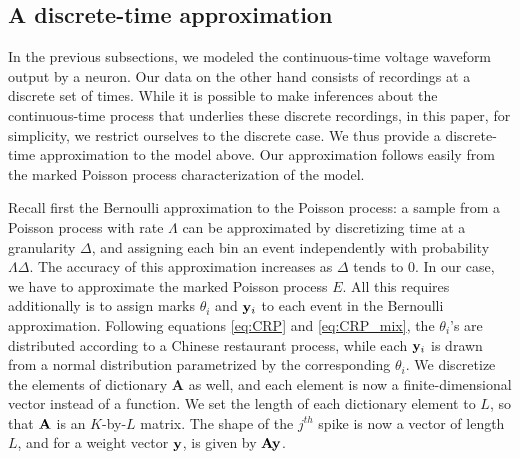 
\subsection{A discrete-time approximation}
In the previous subsections, we modeled the continuous-time voltage waveform output by a neuron. Our data on the other hand consists of recordings
at a discrete set of times. While it is possible to make inferences about the continuous-time process that underlies these discrete recordings,
in this paper, for simplicity, we restrict ourselves to the discrete case. We thus provide a discrete-time approximation to the model above. 
Our approximation follows easily from the marked Poisson process characterization of the model.

Recall first the Bernoulli approximation to the Poisson process: a sample from a Poisson process with rate $\Lambda$ can be approximated by discretizing
time at a granularity $\Delta$, and assigning each bin an event independently with probability $\Lambda\Delta$. The accuracy of this approximation increases 
as $\Delta$ tends to $0$.
%
In our case, we have to approximate the marked Poisson process $E$. All this requires additionally is to assign marks $\theta_i$ and $\mathbf{y}_i$ to each event 
in the Bernoulli approximation. Following equations \eqref{eq:CRP} and \eqref{eq:CRP_mix}, the $\theta_i$'s are distributed according
to a Chinese restaurant process, while each $\mathbf{y}_i$ is drawn from a normal distribution parametrized by the corresponding $\theta_i$. We discretize the 
elements of dictionary $\mathbf{A}$ as well, and each element is now a finite-dimensional vector instead of a function. We set the length of each
dictionary element to $L$, so that $\mathbf{A}$ is an $K$-by-$L$ matrix. The shape of the $j^{th}$ spike is now a vector of length $L$, and for a weight vector
$\mathbf{y}$, is given by $\mathbf{A} \mathbf{y}$.

